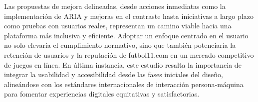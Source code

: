 \documentclass{article}
\begin{document}
	\noindent
	Las propuestas de mejora delineadas, desde acciones inmediatas como la implementación de ARIA y mejoras en el contraste hasta iniciativas a largo plazo como pruebas con usuarios reales, representan un camino viable hacia una plataforma más inclusiva y eficiente. Adoptar un enfoque centrado en el usuario no solo elevaría el cumplimiento normativo, sino que también potenciaría la retención de usuarios y la reputación de futbol11.com en un mercado competitivo de juegos en línea. En última instancia, este estudio resalta la importancia de integrar la usabilidad y accesibilidad desde las fases iniciales del diseño, alineándose con los estándares internacionales de interacción persona-máquina para fomentar experiencias digitales equitativas y satisfactorias.
\end{document}
